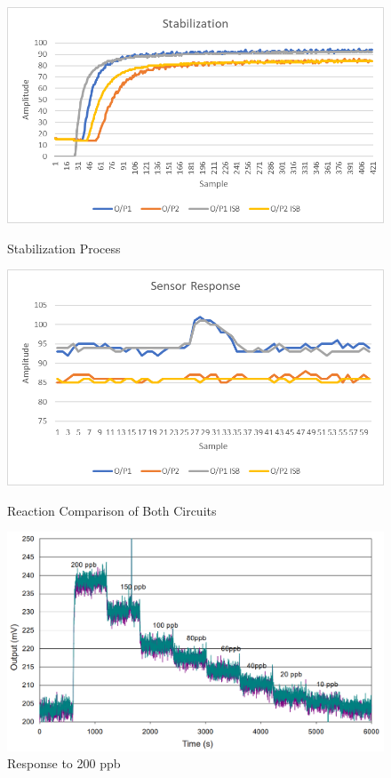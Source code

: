 		\begin{figure}
			\begin{center}
				\includegraphics[width=1\textwidth]{Pics/4}
				\caption{Stabilization Process}
				\label{fig:4.3}
				\vspace{2cm}
				\includegraphics[width=1\textwidth]{Pics/2}
				\caption{Reaction Comparison of Both Circuits}
				\label{fig:4.4}
			\end{center}
		\end{figure}
	\newpage
	\begin{figure}
		\begin{center}
	\includegraphics[width=1\textwidth]{Pics/9}
	\caption{Response to 200 ppb  \cite{Datasheet}}
	\label{fig:4.5}
	\medskip		
\end{center}
\end{figure}
